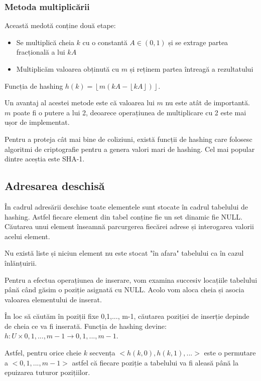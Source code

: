 \subsubsection{Metoda multiplicării}

Această medotă conține două etape:

\begin{itemize}
\item {Se multiplică cheia $k$ cu o constantă $A \in (0,1)$ și se extrage partea fracțională a lui $kA$} 
\item {Multiplicăm valoarea obținută cu $m$ și reținem partea întreagă a rezultatului}
\end{itemize}

Funcția de hashing $h(k)=\left \lfloor m(kA -\left \lfloor kA \right \rfloor) \right \rfloor$.

Un avantaj al acestei metode este că valoarea lui $m$ nu este atât de importantă. $m$ poate fi o putere a lui 2, deoarece operațiunea de multiplicare cu 2 este mai ușor de implementat.

Pentru a proteja cât mai bine de coliziuni, există funcții de hashing care folosesc algoritmi de criptografie pentru a genera valori mari de hashing. Cel mai popular dintre aceștia este SHA-1\cite{Wang2005}.

\subsection{Adresarea deschisă}

În cadrul adresării deschise toate elementele sunt stocate în cadrul tabelului de hashing. Astfel fiecare element din tabel conține fie un set dinamic fie NULL. Căutarea unui element înseamnă parcurgerea fiecărei adrese și interogarea valorii acelui element. 

Nu există liste și niciun element nu este stocat "în afara" tabelului ca în cazul înlănțuirii. 

Pentru a efectua operațiunea de inserare, vom examina succesiv locațiile tabelului până când găsim o poziție asignată cu NULL. Acolo vom aloca cheia și asocia valoarea elementului de inserat.

În loc să căutăm în poziții fixe 0,1,..., m-1, căutarea poziției de inserție depinde de cheia ce va fi inserată. Funcția de hashing devine:
$h:U  \times {0,1,...,m-1} \rightarrow {0,1,...,m-1}$.

Astfel, pentru orice cheie $k$ secvența $<h(k,0), h(k,1), ...>$ este o permutare a $<0,1,...,m-1>$ astfel că fiecare poziție a tabelului va fi aleasă până la epuizarea tuturor pozițiilor.

